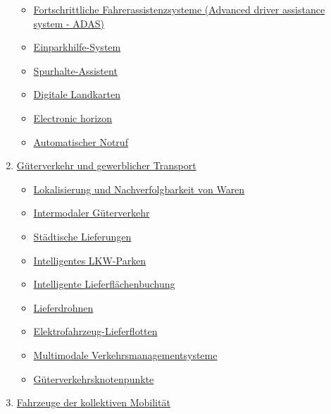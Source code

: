 \documentclass[
]{book}
\providecommand{\tightlist}{%
  \setlength{\itemsep}{0pt}\setlength{\parskip}{0pt}}
\begin{document}
\begin{enumerate}
  \begin{itemize}
  \tightlist
  \item
    \protect\hyperlink{adas}{Fortschrittliche Fahrerassistenzsysteme (Advanced driver assistance system - ADAS)}\\
  \item
    \protect\hyperlink{parking_assistance}{Einparkhilfe-System}\\
  \item
    \protect\hyperlink{lane_keeping}{Spurhalte-Assistent}\\
  \item
    \protect\hyperlink{digital_maps}{Digitale Landkarten}\\
  \item
    \protect\hyperlink{ehorizon}{Electronic horizon}\\
  \item
    \protect\hyperlink{ecall}{Automatischer Notruf}\\
  \end{itemize}
\item
  \protect\hyperlink{freight}{Güterverkehr und gewerblicher Transport}

  \begin{itemize}
  \tightlist
  \item
    \protect\hyperlink{dangerous_goods}{Lokalisierung und Nachverfolgbarkeit von Waren}\\
  \item
    \protect\hyperlink{intermodal_freight}{Intermodaler Güterverkehr}\\
  \item
    \protect\hyperlink{urban_delivery}{Städtische Lieferungen}\\
  \item
    \protect\hyperlink{intelligent_truck_park}{Intelligentes LKW-Parken}\\
  \item
    \protect\hyperlink{space_book}{Intelligente Lieferflächenbuchung}\\
  \item
    \protect\hyperlink{delivery_drone}{Lieferdrohnen}\\
  \item
    \protect\hyperlink{electric_delivery_fleets}{Elektrofahrzeug-Lieferflotten}\\
  \item
    \protect\hyperlink{mtms}{Multimodale Verkehrsmanagementsysteme}\\
  \item
    \protect\hyperlink{freight_hubs}{Güterverkehrsknotenpunkte}\\
  \end{itemize}
\item
  \protect\hyperlink{collective}{Fahrzeuge der kollektiven Mobilität}


\end{enumerate}
\end{document}
